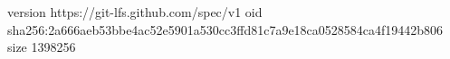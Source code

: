 version https://git-lfs.github.com/spec/v1
oid sha256:2a666aeb53bbe4ac52e5901a530cc3ffd81c7a9e18ca0528584ca4f19442b806
size 1398256
